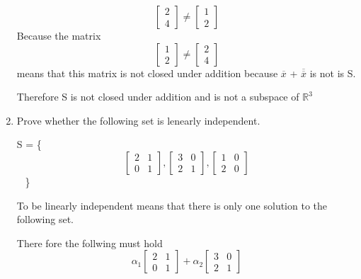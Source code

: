 \documentclass{article}
\begin{document}
\begin{enumerate}
\[\begin{bmatrix}
        2 \\
        4
      \end{bmatrix}
      \neq
      \begin{bmatrix}
        1 \\
        2
      \end{bmatrix}
    \]
    Because the matrix
    \[
      \begin{bmatrix}
        1 \\
        2
      \end{bmatrix}
      \neq
      \begin{bmatrix}
        2 \\
        4
      \end{bmatrix}
    \]
    means that this matrix is not closed under addition because $\overline{x}$ + $\overline{\overline{x}}$ is not is S.
    \par
    Therefore S is not closed under addition and is not a subspace of $\mathbb{R}^3$
  \item Prove whether the following set is lenearly independent.
    \begin{center}
      S =
      \left
      \{
        \mbox
        {
          \[
            \begin{bmatrix}
              2 & 1 \\
              0 & 1 
            \end{bmatrix}
            ,
            \begin{bmatrix}
              3 & 0\\
              2 & 1
            \end{bmatrix}
            ,
            \begin{bmatrix}
              1 & 0\\
              2 & 0
            \end{bmatrix}
          \]
        }
        \right
      \}
    \end{center}
    \par
    To be linearly independent means that there is only one solution to the following set.
    \par
    There fore the follwing must hold
    \[
      \alpha_1
      \begin{bmatrix}
        2 & 1 \\
        0 & 1 
      \end{bmatrix}
      + \alpha_2
      \begin{bmatrix}
        3 & 0\\
        2 & 1

\end{bmatrix}\]
\end{enumerate}
\end{document}
